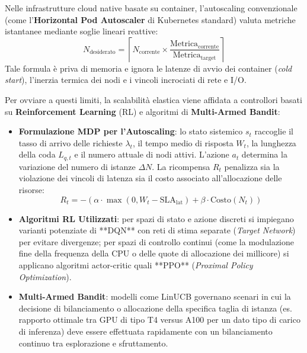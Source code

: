 \documentclass[11pt, a4paper]{article}
\begin{document}
Nelle infrastrutture cloud native basate su container, l'autoscaling convenzionale (come l'\textbf{Horizontal Pod Autoscaler} di Kubernetes standard) valuta metriche istantanee mediante soglie lineari reattive:
\begin{equation}
    N_{\text{desiderato}} = \left\lceil N_{\text{corrente}} \times \frac{\text{Metrica}_{\text{corrente}}}{\text{Metrica}_{\text{target}}} \right\rceil
\end{equation}
Tale formula è priva di memoria e ignora le latenze di avvio dei container (\emph{cold start}), l'inerzia termica dei nodi e i vincoli incrociati di rete e I/O.

Per ovviare a questi limiti, la scalabilità elastica viene affidata a controllori basati su \textbf{Reinforcement Learning} (RL) e algoritmi di \textbf{Multi-Armed Bandit}:
\begin{itemize}
    \item \textbf{Formulazione MDP per l'Autoscaling}: lo stato sistemico $s_t$ raccoglie il tasso di arrivo delle richieste $\lambda_t$, il tempo medio di risposta $W_t$, la lunghezza della coda $L_{q, t}$ e il numero attuale di nodi attivi. L'azione $a_t$ determina la variazione del numero di istanze $\Delta N$. La ricompensa $R_t$ penalizza sia la violazione dei vincoli di latenza sia il costo associato all'allocazione delle risorse:
    \begin{equation}
        R_t = - \left( \alpha \cdot \max(0, W_t - \text{SLA}_{\text{lat}}) + \beta \cdot \text{Costo}(N_t) \right)
    \end{equation}
    \item \textbf{Algoritmi RL Utilizzati}: per spazi di stato e azione discreti si impiegano varianti potenziate di **DQN** con reti di stima separate (\emph{Target Network}) per evitare divergenze; per spazi di controllo continui (come la modulazione fine della frequenza della CPU o delle quote di allocazione dei millicore) si applicano algoritmi actor-critic quali **PPO** (\emph{Proximal Policy Optimization}).
    \item \textbf{Multi-Armed Bandit}: modelli come LinUCB governano scenari in cui la decisione di bilanciamento o allocazione della specifica taglia di istanza (es. rapporto ottimale tra GPU di tipo T4 versus A100 per un dato tipo di carico di inferenza) deve essere effettuata rapidamente con un bilanciamento continuo tra esplorazione e sfruttamento.
\end{itemize}
\end{document}
